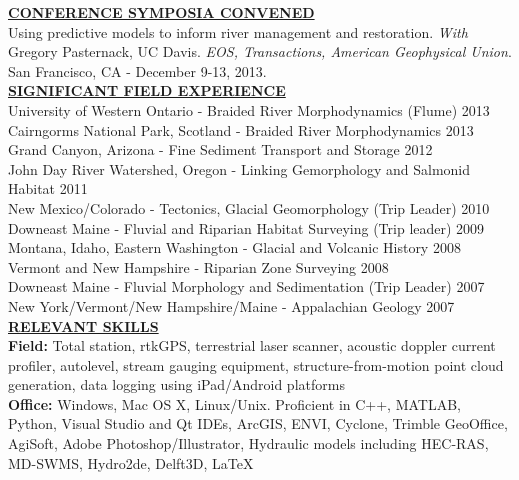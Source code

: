 \documentclass{article}
\begin{document}
\noindent \textbf{\underline{CONFERENCE SYMPOSIA CONVENED}}\\
Using predictive models to inform river management and restoration. \textit{With} Gregory Pasternack, UC Davis. \textit{EOS, Transactions, American Geophysical Union}. San Francisco, CA - December 9-13, 2013.\\

\newpage
\noindent \textbf{\underline{SIGNIFICANT FIELD EXPERIENCE}}\\
University of Western Ontario - Braided River Morphodynamics (Flume) \hfill{}2013\\
Cairngorms National Park, Scotland - Braided River Morphodynamics \hfill{}2013\\
Grand Canyon, Arizona - Fine Sediment Transport and Storage \hfill{} 2012\\
John Day River Watershed, Oregon - Linking Gemorphology and Salmonid Habitat \hfill{} 2011\\
New Mexico/Colorado - Tectonics, Glacial Geomorphology (Trip Leader) \hfill{} 2010\\
Downeast Maine - Fluvial and Riparian Habitat Surveying (Trip leader) \hfill{} 2009\\
Montana, Idaho, Eastern Washington - Glacial and Volcanic History \hfill{} 2008\\
Vermont and New Hampshire - Riparian Zone Surveying \hfill{} 2008\\
Downeast Maine - Fluvial Morphology and Sedimentation (Trip Leader) \hfill{} 2007\\
New York/Vermont/New Hampshire/Maine - Appalachian Geology \hfill{} 2007\\

\noindent \textbf{\underline{RELEVANT SKILLS}}\\
\noindent \textbf{Field:} Total station, rtkGPS, terrestrial laser scanner, acoustic doppler current profiler, autolevel, stream gauging equipment, structure-from-motion point cloud generation, data logging using iPad/Android platforms\\

\noindent \textbf{Office:} Windows, Mac OS X, Linux/Unix. Proficient in C++, MATLAB, Python, Visual Studio and Qt IDEs, ArcGIS, ENVI, Cyclone, Trimble GeoOffice, AgiSoft, Adobe Photoshop/Illustrator, Hydraulic models including HEC-RAS, MD-SWMS, Hydro2de, Delft3D, \LaTeX\\
\end{document}
